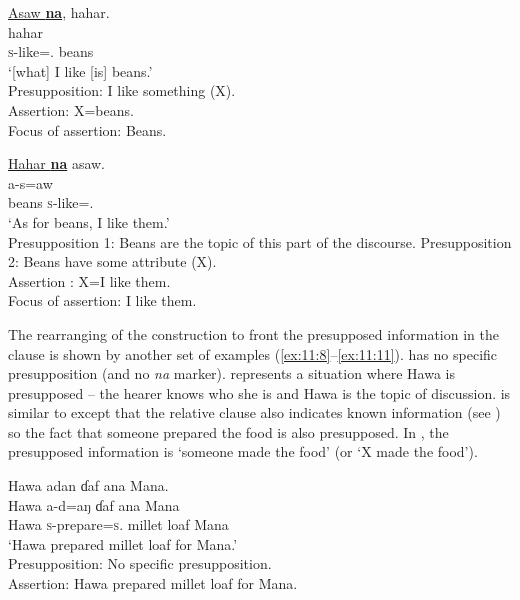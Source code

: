 \ea \label{ex:11:6}
\underline{Asaw  \textbf{na}},  hahar. \\
\gll  {}   hahar\\
      \textsc{s}-like={\oneS}.{\IO} {\PSP}  beans\\
\glt  ‘[what] I like [is] beans.’\\
  Presupposition:     I like something (X). \\
Assertion:     X=beans. \\
Focus of assertion:   Beans.
\z

\ea \label{ex:11:7}
\underline{Hahar  \textbf{na}}  asaw. \\
\gll  {}    a-s=aw\\
      beans  {\PSP} \textsc{s}-like={\oneS}.{\IO}\\
\glt  ‘As for beans, I like them.’ \\
  Presupposition 1:     Beans are the topic of this part of the discourse. 
  Presupposition 2:     Beans have some attribute (X).\\
Assertion :     X=I like them. \\
Focus of assertion:   I like them.
\z

The rearranging of the construction to front the presupposed information in the clause is shown by another set of examples (\ref{ex:11:8}--\ref{ex:11:11}).  has no specific presupposition (and no \textit{na} marker).  represents a situation where Hawa is presupposed -- the hearer knows who she is and Hawa is the topic of discussion.  is similar to  except that the relative clause also indicates known information (see ) so the fact that someone prepared the food is also presupposed.  In , the presupposed information is ‘someone made the food’ (or ‘X made the food’). 

\clearpage
\ea \label{ex:11:8}
Hawa  adan  ɗaf  ana  Mana.\\
\gll  Hawa  a-d=aŋ      ɗaf  ana   Mana\\
      Hawa  \textsc{s}-prepare=\textsc{s}.{\IO}    {millet loaf}  {\DAT} Mana\\
\glt  ‘Hawa prepared millet loaf for Mana.’  \\
Presupposition:     No specific presupposition.\\
  Assertion:     Hawa prepared millet loaf for Mana.
\z

